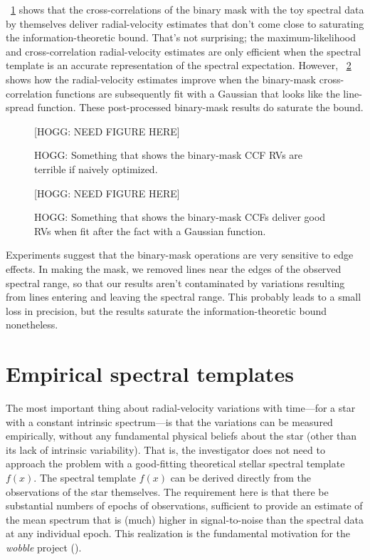 \documentclass[modern]{aastex631}
\newcommand{\project}[1]{\textsl{#1}}
\newcommand{\wobble}{\project{wobble}}
\newcommand{\figref}[1]{\figurename~\ref{#1}}
\begin{document}
\figref{fig:bccfrvswrong} shows that the cross-correlations of the binary mask with the toy spectral data by themselves deliver radial-velocity estimates that don't come close to saturating the information-theoretic bound.
That's not surprising; the maximum-likelihood and cross-correlation radial-velocity estimates are only efficient when the spectral template is an accurate representation of the spectral expectation.
However, \figref{fig:bccfrvs} shows how the radial-velocity estimates improve when the binary-mask cross-correlation functions are subsequently fit with a Gaussian that looks like the line-spread function.
These post-processed binary-mask results do saturate the bound.

\begin{figure}[t]
  \begin{mdframed}
    \begin{center}
    [HOGG: NEED FIGURE HERE]
    \end{center}
    \caption{HOGG: Something that shows the binary-mask CCF RVs are terrible if naively optimized.\label{fig:bccfrvswrong}}
  \end{mdframed}
\end{figure}%
\begin{figure}[t]
  \begin{mdframed}
    \begin{center}
    [HOGG: NEED FIGURE HERE]
    \end{center}
    \caption{HOGG: Something that shows the binary-mask CCFs deliver good RVs when fit after the fact with a Gaussian function.\label{fig:bccfrvs}}
  \end{mdframed}
\end{figure}

Experiments suggest that the binary-mask operations are very sensitive to edge effects.
In making the mask, we removed lines near the edges of the observed spectral range, so that our results aren't contaminated by variations resulting from lines entering and leaving the spectral range.
This probably leads to a small loss in precision, but the results saturate the information-theoretic bound nonetheless.

\section{Empirical spectral templates}\label{sec:templates}

The most important thing about radial-velocity variations with time---for a star with a constant intrinsic spectrum---is that the variations can be measured empirically, without any fundamental physical beliefs about the star (other than its lack of intrinsic variability).
That is, the investigator does not need to approach the problem with a good-fitting theoretical stellar spectral template $f(x)$.
The spectral template $f(x)$ can be derived directly from the observations of the star themselves.
The requirement here is that there be substantial numbers of epochs of observations, sufficient to provide an estimate of the mean spectrum that is (much) higher in signal-to-noise than the spectral data at any individual epoch.
This realization is the fundamental motivation for the \wobble{} project (\citealt{wobble}).
\end{document}
